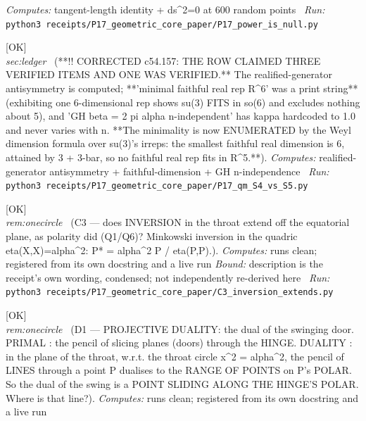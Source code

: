 \begin{description}
\emph{Computes:} tangent-length identity + ds\textasciicircum{}2=0 at 600 random points
\ \emph{Run:} \texttt{python3 receipts/P17\_geometric\_core\_paper/P17\_power\_is\_null.py}
\item[\rcptlabel{P17_qm_S4_vs_S5}{P17R6}\textbf{P17R6}\quad\texttt{P17\_qm\_S4\_vs\_S5}]\hfill\textsf{[OK]}\\
\textit{sec:ledger} \ (**!! CORRECTED c54.157: THE ROW CLAIMED THREE VERIFIED ITEMS AND ONE WAS VERIFIED.** The realified-generator antisymmetry is computed; **'minimal faithful real rep R\textasciicircum{}6' was a print string** (exhibiting one 6-dimensional rep shows su(3) FITS in so(6) and excludes nothing about 5), and 'GH beta = 2 pi alpha n-independent' has kappa hardcoded to 1.0 and never varies with n. **The minimality is now ENUMERATED by the Weyl dimension formula over su(3)'s irreps: the smallest faithful real dimension is 6, attained by 3 + 3-bar, so no faithful real rep fits in R\textasciicircum{}5.**). 
\emph{Computes:} realified-generator antisymmetry + faithful-dimension + GH n-independence
\ \emph{Run:} \texttt{python3 receipts/P17\_geometric\_core\_paper/P17\_qm\_S4\_vs\_S5.py}
\item[\rcptlabel{C3_inversion_extends}{P17R7}\textbf{P17R7}\quad\texttt{C3\_inversion\_extends}]\hfill\textsf{[OK]}\\
\textit{rem:onecircle} \ (C3 --- does INVERSION in the throat extend off the equatorial plane, as polarity did (Q1/Q6)? Minkowski inversion in the quadric eta(X,X)=alpha\textasciicircum{}2: P* = alpha\textasciicircum{}2 P / eta(P,P).). 
\emph{Computes:} runs clean; registered from its own docstring and a live run
 \emph{Bound:} description is the receipt's own wording, condensed; not independently re-derived here
\ \emph{Run:} \texttt{python3 receipts/P17\_geometric\_core\_paper/C3\_inversion\_extends.py}
\item[\rcptlabel{D1_hinge_duality}{P17R8}\textbf{P17R8}\quad\texttt{D1\_hinge\_duality}]\hfill\textsf{[OK]}\\
\textit{rem:onecircle} \ (D1 --- PROJECTIVE DUALITY: the dual of the swinging door. PRIMAL : the pencil of slicing planes (doors) through the HINGE. DUALITY : in the plane of the throat, w.r.t. the throat circle \textbar{}x\textbar{}\textasciicircum{}2 = alpha\textasciicircum{}2, the pencil of LINES through a point P dualises to the RANGE OF POINTS on P's POLAR. So the dual of the swing is a POINT SLIDING ALONG THE HINGE'S POLAR. Where is that line?). 
\emph{Computes:} runs clean; registered from its own docstring and a live run

\end{description}
